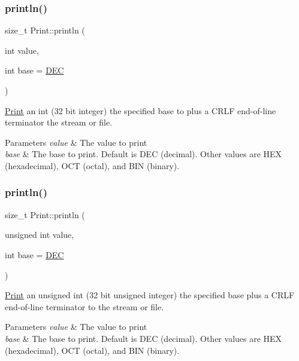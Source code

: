 \subsubsection{\texorpdfstring{println()}{println()}\hspace{0.1cm}{\footnotesize\ttfamily [14/21]}}
{\footnotesize\ttfamily size\+\_\+t Print\+::println (\begin{DoxyParamCaption}\item[{int}]{value,  }\item[{int}]{base = {\ttfamily \hyperlink{docs_2src_2spark__wiring__print_8h_a26e216c38cffa0a9965fa7933ba558b1}{D\+EC}} }\end{DoxyParamCaption})}



\hyperlink{class_print}{Print} an int (32 bit integer) the specified base to plus a C\+R\+LF end-\/of-\/line terminator the stream or file. 


\begin{DoxyParams}{Parameters}
{\em value} & The value to print \\
\hline
{\em base} & The base to print. Default is D\+EC (decimal). Other values are H\+EX (hexadecimal), O\+CT (octal), and B\+IN (binary). \\
\hline
\end{DoxyParams}
\mbox{\label{class_print_a2608232c1f10f654111ff447de16d60b}} 
\subsubsection{\texorpdfstring{println()}{println()}\hspace{0.1cm}{\footnotesize\ttfamily [15/21]}}
{\footnotesize\ttfamily size\+\_\+t Print\+::println (\begin{DoxyParamCaption}\item[{unsigned int}]{value,  }\item[{int}]{base = {\ttfamily \hyperlink{docs_2src_2spark__wiring__print_8h_a26e216c38cffa0a9965fa7933ba558b1}{D\+EC}} }\end{DoxyParamCaption})}



\hyperlink{class_print}{Print} an unsigned int (32 bit unsigned integer) the specified base plus a C\+R\+LF end-\/of-\/line terminator to the stream or file. 


\begin{DoxyParams}{Parameters}
{\em value} & The value to print \\
\hline
{\em base} & The base to print. Default is D\+EC (decimal). Other values are H\+EX (hexadecimal), O\+CT (octal), and B\+IN (binary). \\
\hline
\end{DoxyParams}
\mbox{\label{class_print_a82bbe59b28440c29e55ff3597eb45376}} 

